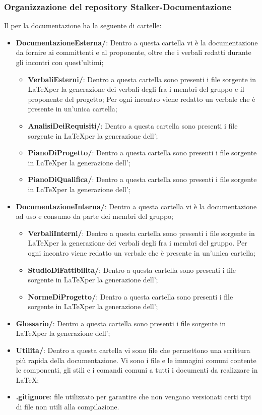 \subsubsection{Organizzazione del repository Stalker-Documentazione}
Il  per la documentazione ha la seguente  di cartelle:
\begin{itemize}
	\item \textbf{DocumentazioneEsterna/}: Dentro a questa cartella vi è la documentazione da fornire ai committenti e al proponente, oltre che i verbali redatti durante gli incontri con quest'ultimi;
	\begin{itemize}
		\item \textbf{VerbaliEsterni/}: Dentro a questa cartella sono presenti i file sorgente in \LaTeX per la generazione dei verbali degli  fra i membri del gruppo e il proponente del progetto;
		Per ogni incontro viene redatto un verbale che è presente in un'unica cartella;
		\item \textbf{AnalisiDeiRequisiti/}: Dentro a questa cartella sono presenti i file sorgente in \LaTeX per la generazione dell'\AdR{};
		\item \textbf{PianoDiProgetto/}: Dentro a questa cartella sono presenti i file sorgente in \LaTeX per la generazione dell'\PdP{};
		\item \textbf{PianoDiQualifica/}: Dentro a questa cartella sono presenti i file sorgente in \LaTeX per la generazione dell'\PdQ{};
	\end{itemize}
	\item \textbf{DocumentazioneInterna/}: Dentro a questa cartella vi è la documentazione ad uso e consumo da parte dei membri del gruppo;
	\begin{itemize}
		\item \textbf{VerbaliInterni/}: Dentro a questa cartella sono presenti i file sorgente in \LaTeX per la generazione dei verbali degli  fra i membri del gruppo.
		Per ogni incontro viene redatto un verbale che è presente in un'unica cartella;
		\item \textbf{StudioDiFattibilita/}: Dentro a questa cartella sono presenti i file sorgente in \LaTeX per la generazione dell'\SdF{};
		\item \textbf{NormeDiProgetto/}: Dentro a questa cartella sono presenti i file sorgente in \LaTeX per la generazione dell'\NdP{};
	\end{itemize}	
	\item \textbf{Glossario/}: Dentro a questa cartella sono presenti i file sorgente in \LaTeX per la generazione dell'\Glossario{};
	\item \textbf{Utilita/}: Dentro a questa cartella vi sono file che permettono una scrittura più rapida della documentazione.
	Vi sono i file e le immagini comuni contente le componenti, gli stili e i comandi comuni a tutti i documenti da realizzare in \LaTeX;
	\item \textbf{.gitignore}: file utilizzato per garantire che non vengano versionati certi tipi di file non utili alla compilazione.
\end{itemize}

